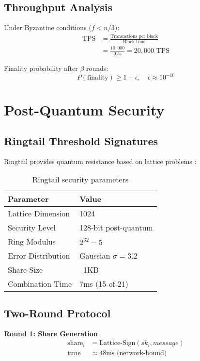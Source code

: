 \documentclass[11pt]{article}
\begin{document}
\subsection{Throughput Analysis}

Under Byzantine conditions ($f < n/3$):
\begin{align}
\text{TPS} &= \frac{\text{Transactions per block}}{\text{Block time}} \\
&= \frac{10,000}{0.5\text{s}} = 20,000 \text{ TPS}
\end{align}

Finality probability after $\beta$ rounds:
\begin{equation}
P(\text{finality}) \geq 1 - \epsilon, \quad \epsilon \approx 10^{-10}
\end{equation}

\section{Post-Quantum Security}

\subsection{Ringtail Threshold Signatures}

Ringtail provides quantum resistance based on lattice problems \cite{ntt-ringtail}:

\begin{table}[h]
\centering
\begin{tabular}{@{}ll@{}}
\toprule
\textbf{Parameter} & \textbf{Value} \\
\midrule
Lattice Dimension & 1024 \\
Security Level & 128-bit post-quantum \\
Ring Modulus & $2^{32} - 5$ \\
Error Distribution & Gaussian $\sigma = 3.2$ \\
Share Size & ~1KB \\
Combination Time & 7ms (15-of-21) \\
\bottomrule
\end{tabular}
\caption{Ringtail security parameters}
\label{tab:ringtail-params}
\end{table}

\subsection{Two-Round Protocol}

\textbf{Round 1: Share Generation}
\begin{align}
\text{share}_i &= \text{Lattice-Sign}(sk_i, message) \\
\text{time} &\approx 48\text{ms (network-bound)}
\end{align}
\end{document}

